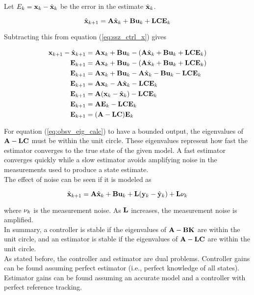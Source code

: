 Let $E_k = \mathbf{x}_k - \hat{\mathbf{x}}_k$ be the error in the estimate
$\hat{\mathbf{x}}_k$.

\begin{equation*}
  \hat{\mathbf{x}}_{k+1} = \mathbf{A}\hat{\mathbf{x}}_k + \mathbf{B}\mathbf{u}_k +
    \mathbf{L}\mathbf{C}\mathbf{E}_k
\end{equation*}

Subtracting this from equation (\ref{eq:ssz_ctrl_x}) gives

\begin{align}
  \mtx{x}_{k+1} - \hat{\mtx{x}}_{k+1} &= \mtx{A}\mtx{x}_k + \mtx{B}\mtx{u}_k -
    (\mtx{A}\hat{\mtx{x}}_k + \mtx{B}\mtx{u}_k +
     \mtx{L}\mtx{C}\mtx{E}_k) \nonumber \\
  \mtx{E}_{k+1} &= \mtx{A}\mtx{x}_k + \mtx{B}\mtx{u}_k -
    (\mtx{A}\hat{\mtx{x}}_k + \mtx{B}\mtx{u}_k + \mtx{L}\mtx{C}\mtx{E}_k)
    \nonumber \\
  \mtx{E}_{k+1} &= \mtx{A}\mtx{x}_k + \mtx{B}\mtx{u}_k -
    \mtx{A}\hat{\mtx{x}}_k - \mtx{B}\mtx{u}_k - \mtx{L}\mtx{C}\mtx{E}_k
    \nonumber \\
  \mtx{E}_{k+1} &= \mtx{A}\mtx{x}_k - \mtx{A}\hat{\mtx{x}}_k -
    \mtx{L}\mtx{C}\mtx{E}_k \nonumber \\
  \mtx{E}_{k+1} &= \mtx{A}(\mtx{x}_k - \hat{\mtx{x}}_k) -
    \mtx{L}\mtx{C}\mtx{E}_k \nonumber \\
  \mtx{E}_{k+1} &= \mtx{A}\mtx{E}_k - \mtx{L}\mtx{C}\mtx{E}_k \nonumber \\
  \mtx{E}_{k+1} &= (\mtx{A} - \mtx{L}\mtx{C})\mtx{E}_k \label{eq:obsv_eig_calc}
\end{align}

For equation (\ref{eq:obsv_eig_calc}) to have a bounded output, the eigenvalues
of $\mathbf{A} - \mathbf{L}\mathbf{C}$ must be within the unit circle. These eigenvalues
represent how fast the estimator converges to the true state of the given
\gls{model}. A fast estimator converges quickly while a slow estimator avoids
amplifying noise in the measurements used to produce a state estimate. \\

The effect of noise can be seen if it is modeled
 as

\begin{equation*}
  \hat{\mathbf{x}}_{k+1} = \mathbf{A}\hat{\mathbf{x}}_k + \mathbf{B}\mathbf{u}_k +
    \mathbf{L} (\mathbf{y}_k - \hat{\mathbf{y}}_k) + \mathbf{L}\mathbf{\nu}_k
\end{equation*}

where $\mathbf{\nu}_k$ is the measurement noise. As $\mathbf{L}$ increases, the
measurement noise is amplified. \\

In summary, a controller is stable if the eigenvalues of
$\mathbf{A} - \mathbf{B}\mathbf{K}$ are within the unit circle, and an estimator is
stable if the eigenvalues of $\mathbf{A} - \mathbf{L}\mathbf{C}$ are within the unit
circle. \\

As stated before, the controller and estimator are dual problems. Controller
gains can be found assuming perfect estimator (i.e., perfect knowledge of all
\glspl{state}). Estimator gains can be found assuming an accurate \gls{model}
and a controller with perfect \gls{reference tracking}.
